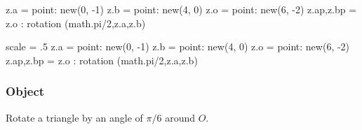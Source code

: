 \begin{minipage}{.6\textwidth}
\begin{tkzexample}[latex=0cm,small,code only]
\begin{tkzelements}
  z.a       = point:  new(0, -1)
  z.b       = point:  new(4, 0)
  z.o       = point:  new(6, -2)
  z.ap,z.bp = z.o : rotation (math.pi/2,z.a,z.b)
\end{tkzelements}
\end{tkzexample}
\end{minipage}
\begin{minipage}{.4\textwidth}
\begin{tkzelements}
      scale = .5
    z.a = point:  new(0, -1)
    z.b = point:  new(4, 0)
    z.o = point:  new(6, -2)
    z.ap,z.bp =  z.o : rotation (math.pi/2,z.a,z.b)
\end{tkzelements}
\hspace*{\fill}
\end{minipage}

\subsubsection{Object } %
\label{ssub:object_rotation}
Rotate a triangle by an angle of $\pi/6$ around $O$.

